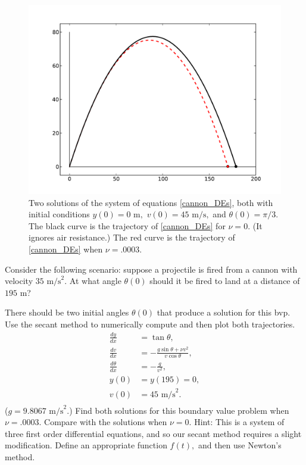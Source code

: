 \begin{figure}[ht]
\centering
\includegraphics[width=\textwidth]{Cannon_with_AirResistance.pdf}
\caption{Two solutions of the system of equations \eqref{cannon_DEs}, both with initial conditions  $y(0) = 0 \text{ m},$ $ v(0) = 45 \text{ m/s},$ and $\theta(0)=\pi/3$. The black curve is the trajectory of \eqref{cannon_DEs} for $\nu = 0.$ (It ignores air resistance.) The red curve is the trajectory of \eqref{cannon_DEs} when $\nu = .0003$. }
\label{shooting:cannonprob}
\end{figure}

\pagebreak
\begin{problem}
Consider the following scenario: suppose a projectile is fired from a cannon with velocity $35\text{ m/s}^2.$ At what angle $\theta(0)$ should it be fired to land at a distance of $195\text{ m}$? 

There should be two initial angles $\theta(0)$ that produce a solution for this bvp. Use the secant method to numerically compute and then plot both trajectories.
\begin{align*}
\frac{dy}{dx} &= \tan {\theta} ,\\
\frac{dv}{dx} &= -\frac{g \sin{\theta} + \nu v^2}{v \cos{\theta}},\\
\frac{d\theta}{dx} &= -\frac{g}{v^2},\\
y(0)&= y(195) = 0,\\
v(0) &= 45 \text{ m/s}^2.\\
\end{align*}
($g = 9.8067\text{ m/s}^2.$) Find both solutions for this boundary value problem when $\nu = .0003$. Compare with the solutions when $\nu = 0.$ Hint: This is a system of three first order differential equations, and so our secant method requires a slight modification. Define an appropriate function $f(t),$ and then use Newton's method.
\end{problem}


% 






